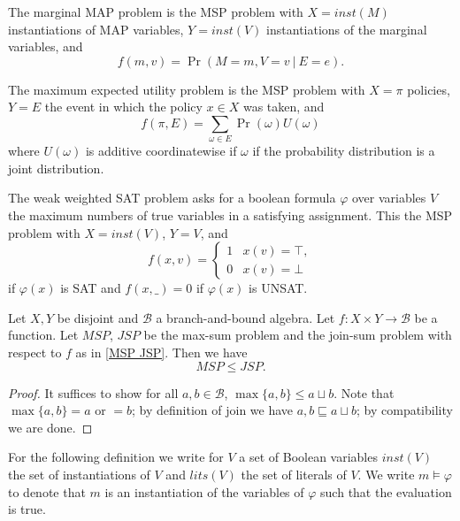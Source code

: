 \documentclass[acmsmall,review]{acmart}\settopmatter{printfolios=true,printccs=false,printacmref=false}
\begin{document}
\begin{example}
  The marginal MAP problem is the MSP problem with $X = inst(M)$ instantiations of MAP variables, $Y = inst(V)$ instantiations of the marginal variables, and $$f(m,v) = \Pr(M=m, V=v \ |\  E=e).$$
\end{example}

\begin{example}
  The maximum expected utility problem is the MSP problem with $X = \pi$ policies, $Y = E$ the event in which the policy $x \in X$ was taken, and 
    $$f(\pi, E) = \sum_{\omega \in E} \Pr(\omega) U(\omega)$$
  where $U(\omega)$ is additive coordinatewise if $\omega$ if the probability distribution is a joint distribution.
\end{example}

\begin{example}
  The weak weighted SAT problem asks for a boolean formula $\varphi$ over variables $V$ the maximum numbers of true variables in a satisfying assignment. This the MSP problem with $X = inst(V)$, $Y = V$, and 
  $$f(x,v) = \begin{cases}
    1 & x(v) = \top , \\ 0 & x(v) = \bot
  \end{cases}$$
  if $\varphi(x)$ is SAT and $f(x, \_) = 0$ if $\varphi(x)$ is UNSAT.
\end{example}

\begin{lemma}\label{weak}
  Let $X,Y$ be disjoint and $\mathcal B$ a branch-and-bound algebra. Let $f : X \times Y \to \mathcal B$ be a function. Let $MSP$, $JSP$ be the max-sum problem and the join-sum problem with respect to $f$ as in \ref{MSP JSP}. Then we have
  \begin{equation}
    MSP \leq JSP.
  \end{equation}
\end{lemma}

\begin{proof}
  It suffices to show for all $a,b \in \mathcal B$, $\max \{a,b\} \leq a \sqcup b$. Note that $\max\{a,b\}=a$ or $=b$; by definition of join we have $a,b \sqsubseteq a \sqcup b$; by compatibility we are done.
\end{proof}

For the following definition we write for $V$ a set of Boolean variables $inst(V)$ the set of instantiations of $V$ and $lits(V)$ the set of literals of $V$. We write $m \models \varphi$ to denote that $m$ is an instantiation of the variables of $\varphi$ such that the evaluation is true.
\end{document}
